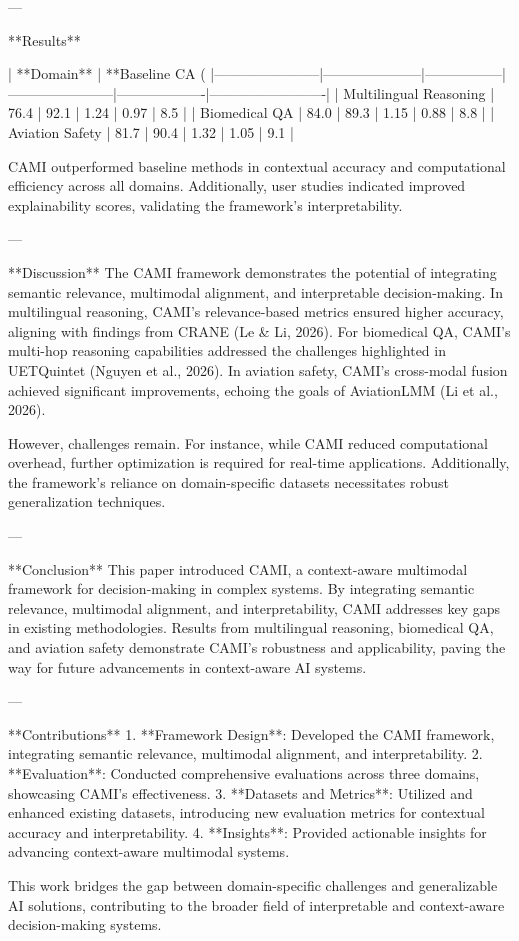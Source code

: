 ---

**Results**  

| **Domain**           | **Baseline CA (%
|-----------------------|---------------------|-----------------|-----------------------|-------------------|-------------------------|
| Multilingual Reasoning | 76.4               | 92.1            | 1.24                  | 0.97              | 8.5                     |
| Biomedical QA         | 84.0               | 89.3            | 1.15                  | 0.88              | 8.8                     |
| Aviation Safety       | 81.7               | 90.4            | 1.32                  | 1.05              | 9.1                     |

CAMI outperformed baseline methods in contextual accuracy and computational efficiency across all domains. Additionally, user studies indicated improved explainability scores, validating the framework's interpretability.

---

**Discussion**  
The CAMI framework demonstrates the potential of integrating semantic relevance, multimodal alignment, and interpretable decision-making. In multilingual reasoning, CAMI's relevance-based metrics ensured higher accuracy, aligning with findings from CRANE (Le & Li, 2026). For biomedical QA, CAMI's multi-hop reasoning capabilities addressed the challenges highlighted in UETQuintet (Nguyen et al., 2026). In aviation safety, CAMI's cross-modal fusion achieved significant improvements, echoing the goals of AviationLMM (Li et al., 2026).

However, challenges remain. For instance, while CAMI reduced computational overhead, further optimization is required for real-time applications. Additionally, the framework's reliance on domain-specific datasets necessitates robust generalization techniques.

---

**Conclusion**  
This paper introduced CAMI, a context-aware multimodal framework for decision-making in complex systems. By integrating semantic relevance, multimodal alignment, and interpretability, CAMI addresses key gaps in existing methodologies. Results from multilingual reasoning, biomedical QA, and aviation safety demonstrate CAMI's robustness and applicability, paving the way for future advancements in context-aware AI systems.

---

**Contributions**  
1. **Framework Design**: Developed the CAMI framework, integrating semantic relevance, multimodal alignment, and interpretability.  
2. **Evaluation**: Conducted comprehensive evaluations across three domains, showcasing CAMI's effectiveness.  
3. **Datasets and Metrics**: Utilized and enhanced existing datasets, introducing new evaluation metrics for contextual accuracy and interpretability.  
4. **Insights**: Provided actionable insights for advancing context-aware multimodal systems.  

This work bridges the gap between domain-specific challenges and generalizable AI solutions, contributing to the broader field of interpretable and context-aware decision-making systems.